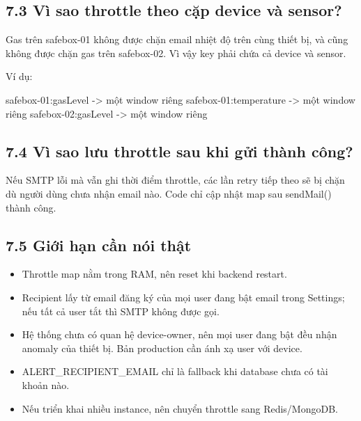 \documentclass[11pt,oneside,openany]{book}
\renewcommand{\texttt}[1]{{\ttfamily\small #1}}
\newenvironment{Shaded}{\begin{snugshade}}{\end{snugshade}}
\newcommand{\NormalTok}[1]{\textcolor[rgb]{0.81,0.81,0.76}{#1}}
\renewenvironment{Shaded}{%
  \def\FrameCommand{\fboxsep=8pt\colorbox{shadecolor}}%
  \MakeFramed{\advance\hsize-\width\FrameRestore}%
}{\endMakeFramed}
\providecommand{\tightlist}{\setlength{\itemsep}{1pt}\setlength{\parskip}{0pt}}
\begin{document}
\subsection{7.3 Vì sao throttle theo cặp device và
sensor?}\label{73-vuxec-sao-throttle-theo-cux1eb7p-device-vuxe0-sensor}

Gas trên \texttt{safebox-01} không được chặn email nhiệt độ trên cùng
thiết bị, và cũng không được chặn gas trên \texttt{safebox-02}. Vì vậy
key phải chứa cả device và sensor.

Ví dụ:

\begin{Shaded}
\begin{Highlighting}[]
\NormalTok{safebox{-}01:gasLevel       {-}\textgreater{} một window riêng}
\NormalTok{safebox{-}01:temperature    {-}\textgreater{} một window riêng}
\NormalTok{safebox{-}02:gasLevel       {-}\textgreater{} một window riêng}
\end{Highlighting}
\end{Shaded}

\subsection{7.4 Vì sao lưu throttle sau khi gửi thành
công?}\label{74-vuxec-sao-lux1b0u-throttle-sau-khi-gux1eedi-thuxe0nh-cuxf4ng}

Nếu SMTP lỗi mà vẫn ghi thời điểm throttle, các lần retry tiếp theo sẽ
bị chặn dù người dùng chưa nhận email nào. Code chỉ cập nhật map sau
\texttt{sendMail()} thành công.

\subsection{7.5 Giới hạn cần nói
thật}\label{75-giux1edbi-hux1ea1n-cux1ea7n-nuxf3i-thux1eadt}

\begin{itemize}
\tightlist
\item
  Throttle map nằm trong RAM, nên reset khi backend restart.
\item
  Recipient lấy từ email đăng ký của mọi user đang bật email trong
  Settings; nếu tất cả user tắt thì SMTP không được gọi.
\item
  Hệ thống chưa có quan hệ device-owner, nên mọi user đang bật đều nhận
  anomaly của thiết bị. Bản production cần ánh xạ user với device.
\item
  \texttt{ALERT\_RECIPIENT\_EMAIL} chỉ là fallback khi database chưa có
  tài khoản nào.
\item
  Nếu triển khai nhiều instance, nên chuyển throttle sang Redis/MongoDB.
\end{itemize}
\end{document}

